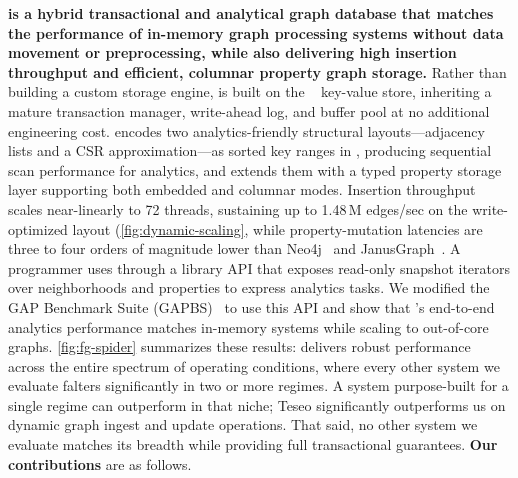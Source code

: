 \textbf{\project{} is a hybrid transactional and analytical graph database that matches the performance of in-memory graph processing systems without data movement or preprocessing, while also delivering high insertion throughput and efficient, columnar property graph storage.}
Rather than building a custom storage engine, \project{} is built on the \wt{}~\cite{WiredTigerDocumentation} key-value store, inheriting a mature transaction manager, write-ahead log, and buffer pool at no additional engineering cost.
\project{} encodes two analytics-friendly structural layouts---adjacency lists and a CSR approximation---as sorted key ranges in \wt{}, producing sequential scan performance for analytics, and extends them with a typed property storage layer supporting both embedded and columnar modes.
Insertion throughput scales near-linearly to 72 threads, sustaining up to 1.48\,M edges/sec on the write-optimized layout (\autoref{fig:dynamic-scaling}, while property-mutation latencies are three to four orders of magnitude lower than Neo4j~\cite{neo4j} and JanusGraph~\cite{janusgraph}.
A programmer uses \project{} through a library API that exposes read-only snapshot iterators over neighborhoods and properties to express analytics tasks. We modified the GAP Benchmark Suite (GAPBS)~\cite{beamer2015gap} to use this API and show that \project{}'s end-to-end analytics performance matches in-memory systems while scaling to out-of-core graphs.
\autoref{fig:fg-spider} summarizes these results: \project{} delivers robust performance across the entire spectrum of operating conditions, where every other system we evaluate falters significantly in two or more regimes.
A system purpose-built for a single regime can outperform \project{} in that niche; Teseo significantly outperforms us on dynamic graph ingest and update operations.
That said, no other system we evaluate matches its breadth while providing full transactional guarantees.
\textbf{Our contributions} are as follows.

